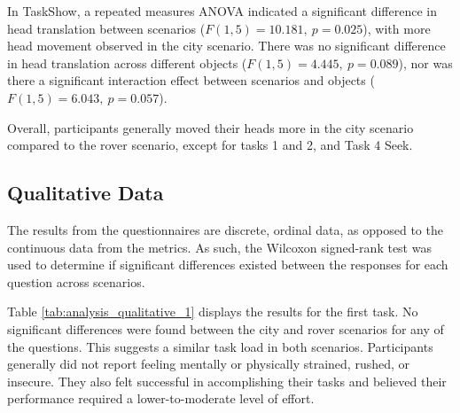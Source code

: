             In TaskShow, a repeated measures ANOVA indicated a significant difference in head translation between scenarios ($F(1, 5) = 10.181,\ p = 0.025$), with more head movement observed in the city scenario. There was no significant difference in head translation across different objects ($F(1, 5) = 4.445,\ p = 0.089$), nor was there a significant interaction effect between scenarios and objects ($F(1, 5) = 6.043,\ p = 0.057$).

            Overall, participants generally moved their heads more in the city scenario compared to the rover scenario, except for tasks 1 and 2, and Task 4 Seek.

    \subsection{Qualitative Data}

        The results from the questionnaires are discrete, ordinal data, as opposed to the continuous data from the metrics. As such, the Wilcoxon signed-rank test was used to determine if significant differences existed between the responses for each question across scenarios.

        Table \ref{tab:analysis_qualitative_1} displays the results for the first task. No significant differences were found between the city and rover scenarios for any of the questions. This suggests a similar task load in both scenarios. Participants generally did not report feeling mentally or physically strained, rushed, or insecure. They also felt successful in accomplishing their tasks and believed their performance required a lower-to-moderate level of effort.
       
